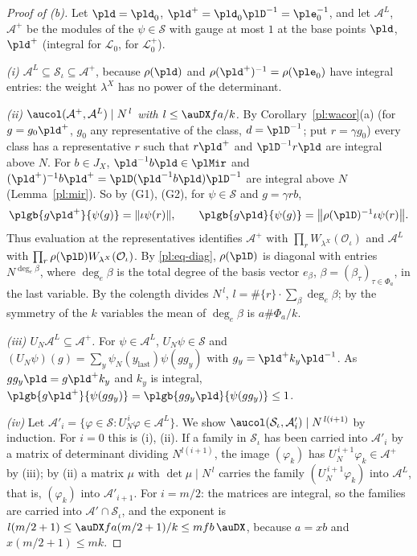 \documentclass[10pt]{amsart}
\theoremstyle{definition}
\theoremstyle{remark}
\providecommand{\auO}{\mathcal O}
\providecommand{\auPa}{\Phi_a}
\providecommand{\auS}{\mathcal S}
\begin{document}
\begin{proof}[Proof of {\rm(b)}]
Let $\pld=\pld_0$, $\pld^+=\pld_0\plD^{-1}=\ple_0^{-1}$, and let $\mathcal A^L$, $\mathcal A^+$ be
the modules of the $\psi\in\auS$ with gauge at most $1$ at the base points $\pld$, $\pld^+$
(integral for $\mathcal L_0$, for $\mathcal L_0^+$).

\emph{{\rm(i)} $\mathcal A^L\subseteq\auS_\iota\subseteq\mathcal A^+$}, because $\rho(\pld)$ and
$\rho(\pld^+)^{-1}=\rho(\ple_0)$ have integral entries: the weight $\lambda^X$ has no power of the
determinant.

\emph{{\rm(ii)} $\aucol(\mathcal A^+,\mathcal A^L)\mid N^{\,l}$ with $l\le\auDX fa/k$.} By
Corollary~\ref{pl:wacor}(a) (for $g=g_0\pld^+$, $g_0$ any representative of the class, $d=\plD^{-1}$;
put $r=\gamma g_0$) every class has a representative $r$ such that $r\pld^+$ and $\plD^{-1}r\pld$ are integral above $N$. For $b\in J_X$,
$\pld^{-1}b\pld\in\plMir$ and $(\pld^+)^{-1}b\pld^+=\plD(\pld^{-1}b\pld)\plD^{-1}$ are integral
above $N$ (Lemma~\ref{pl:mir}). So by (G1), (G2), for $\psi\in\auS$ and $g=\gamma rb$,
\[
\plgb{g\pld^+}{\psi(g)}=\|\iota\psi(r)\|,\qquad\plgb{g\pld}{\psi(g)}=\bigl\|\rho(\plD)^{-1}\iota
\psi(r)\bigr\| .
\]
Thus evaluation at the representatives identifies $\mathcal A^+$ with $\prod_rW_{\lambda^X}
(\auO_\iota)$ and $\mathcal A^L$ with $\prod_r\rho(\plD)W_{\lambda^X}(\auO_\iota)$. By
\eqref{pl:eq-diag}, $\rho(\plD)$ is diagonal with entries $N^{\deg_e\beta}$, where $\deg_e\beta$
is the total degree of the basis vector $e_\beta$, $\beta=(\beta_\tau)_{\tau\in\auPa}$, in the
last variable. By {\cite[Lemma~2.3(a)]{P50}} the colength divides $N^{\,l}$, $l=\#\{r\}\cdot\sum_\beta
\deg_e\beta$; by the symmetry of the $k$ variables the mean of $\deg_e\beta$ is $a\#\auPa/k$.

\emph{{\rm(iii)} $U_N\mathcal A^L\subseteq\mathcal A^+$.} For $\psi\in\mathcal A^L$, $U_N\psi\in
\auS$ and $(U_N\psi)(g)=\sum_y\psi_N(y_{\mathrm{last}})\psi(gg_y)$ with $g_y=\pld^+k_y\pld^{-1}$.
As $gg_y\pld=g\pld^+k_y$ and $k_y$ is integral, $\plgb{g\pld^+}{\psi(gg_y)}=\plgb{gg_y\pld}{\psi(g
g_y)}\le1$.

\emph{{\rm(iv)}} Let $\mathcal A'_i=\{\varphi\in\auS:U_N^{\,i}\varphi\in\mathcal A^L\}$. We show
$\aucol(\auS_\iota,\mathcal A'_i)\mid N^{\,l(i+1)}$ by induction. For $i=0$ this is (i), (ii). If
a family in $\auS_\iota$ has been carried into $\mathcal A'_i$ by a matrix of determinant dividing
$N^{l(i+1)}$, the image $(\varphi_k)$ has $U_N^{\,i+1}\varphi_k\in\mathcal A^+$ by (iii); by (ii)
a matrix $\mu$ with $\det\mu\mid N^{\,l}$ carries the family $(U_N^{\,i+1}\varphi_k)$ into
$\mathcal A^L$, that is, $(\varphi_k)$ into $\mathcal A'_{i+1}$. For $i=m/2$: the matrices are
integral, so the families are carried into $\mathcal A'\cap\auS_\iota$, and the exponent is
$l(m/2+1)\le\auDX fa(m/2+1)/k\le mfb\,\auDX$, because $a=xb$ and $x(m/2+1)\le mk$.
\end{proof}
\end{document}

